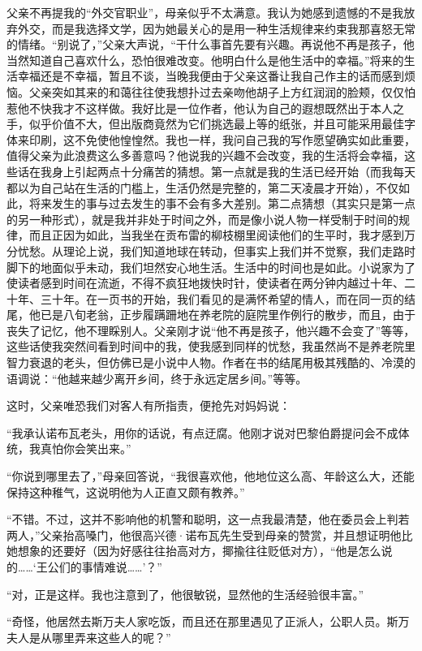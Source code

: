 \par 父亲不再提我的“外交官职业”，母亲似乎不太满意。我认为她感到遗憾的不是我放弃外交，而是我选择文学，因为她最关心的是用一种生活规律来约束我那喜怒无常的情绪。“别说了，”父亲大声说，“干什么事首先要有兴趣。再说他不再是孩子，他当然知道自己喜欢什么，恐怕很难改变。他明白什么是他生活中的幸福。”将来的生活幸福还是不幸福，暂且不谈，当晚我便由于父亲这番让我自己作主的话而感到烦恼。父亲突如其来的和蔼往往使我想扑过去亲吻他胡子上方红润润的脸颊，仅仅怕惹他不快我才不这样做。我好比是一位作者，他认为自己的遐想既然出于本人之手，似乎价值不大，但出版商竟然为它们挑选最上等的纸张，并且可能采用最佳字体来印刷，这不免使他惶惶然。我也一样，我问自己我的写作愿望确实如此重要，值得父亲为此浪费这么多善意吗？他说我的兴趣不会改变，我的生活将会幸福，这些话在我身上引起两点十分痛苦的猜想。第一点就是我的生活已经开始（而我每天都以为自己站在生活的门槛上，生活仍然是完整的，第二天凌晨才开始），不仅如此，将来发生的事与过去发生的事不会有多大差别。第二点猜想（其实只是第一点的另一种形式），就是我并非处于时间之外，而是像小说人物一样受制于时间的规律，而且正因为如此，当我坐在贡布雷的柳枝棚里阅读他们的生平时，我才感到万分忧愁。从理论上说，我们知道地球在转动，但事实上我们并不觉察，我们走路时脚下的地面似乎未动，我们坦然安心地生活。生活中的时间也是如此。小说家为了使读者感到时间在流逝，不得不疯狂地拨快时针，使读者在两分钟内越过十年、二十年、三十年。在一页书的开始，我们看见的是满怀希望的情人，而在同一页的结尾，他已是八旬老翁，正步履蹒跚地在养老院的庭院里作例行的散步，而且，由于丧失了记忆，他不理睬别人。父亲刚才说“他不再是孩子，他兴趣不会变了”等等，这些话使我突然间看到时间中的我，使我感到同样的忧愁，我虽然尚不是养老院里智力衰退的老头，但仿佛已是小说中人物。作者在书的结尾用极其残酷的、冷漠的语调说：“他越来越少离开乡间，终于永远定居乡间。”等等。
\par 这时，父亲唯恐我们对客人有所指责，便抢先对妈妈说：
\par “我承认诺布瓦老头，用你的话说，有点迂腐。他刚才说对巴黎伯爵提问会不成体统，我真怕你会笑出来。”
\par “你说到哪里去了，”母亲回答说，“我很喜欢他，他地位这么高、年龄这么大，还能保持这种稚气，这说明他为人正直又颇有教养。”
\par “不错。不过，这并不影响他的机警和聪明，这一点我最清楚，他在委员会上判若两人，”父亲抬高嗓门，他很高兴德·诺布瓦先生受到母亲的赞赏，并且想证明他比她想象的还要好（因为好感往往抬高对方，揶揄往往贬低对方），“他是怎么说的……‘王公们的事情难说……’？”
\par “对，正是这样。我也注意到了，他很敏锐，显然他的生活经验很丰富。”
\par “奇怪，他居然去斯万夫人家吃饭，而且还在那里遇见了正派人，公职人员。斯万夫人是从哪里弄来这些人的呢？”
